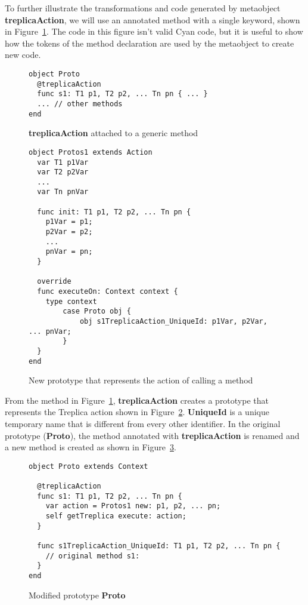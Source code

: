 \documentclass[preprint,review]{elsarticle}
\newcommand{\srcstyle}[1]{\ttfamily\textbf{#1}\rmfamily}
\begin{document}
To  further  illustrate  the  transformations and  code  generated  by
metaobject \srcstyle{treplicaAction}, we will  use an annotated method
with a single keyword, shown in Figure~\ref{fig:tag}. The code in this
figure isn't valid Cyan code, but it  is useful to show how the tokens
of the  method declaration are  used by  the metaobject to  create new
code.
\begin{figure}[hp]
\centering
\begin{lstlisting}
object Proto
  @treplicaAction
  func s1: T1 p1, T2 p2, ... Tn pn { ... }
  ... // other methods
end
\end{lstlisting}
\caption{\srcstyle{treplicaAction} attached to a generic method}
\label{fig:tag}
\end{figure}

\begin{figure}[hp]
\centering
\begin{lstlisting}
object Protos1 extends Action
  var T1 p1Var
  var T2 p2Var
  ...
  var Tn pnVar

  func init: T1 p1, T2 p2, ... Tn pn {
    p1Var = p1;
    p2Var = p2;
    ...
    pnVar = pn;
  }

  override
  func executeOn: Context context {
    type context
        case Proto obj {
            obj s1TreplicaAction_UniqueId: p1Var, p2Var, ... pnVar;
        }
  }
end
\end{lstlisting}
\caption{New prototype that represents the action of calling a method}
\label{fig:protos1}
\end{figure}

From  the  method in  Figure~\ref{fig:tag},  \srcstyle{treplicaAction}
creates  a prototype  that  represents the  Treplica  action shown  in
Figure~\ref{fig:protos1}.  \srcstyle{UniqueId}  is a  unique temporary
name that is  different from every other identifier.   In the original
prototype    (\srcstyle{Proto}),    the    method    annotated    with
\srcstyle{treplicaAction} is  renamed and a  new method is  created as
shown in Figure~\ref{fig:newproto}.

\begin{figure}[hp]
\centering
\begin{lstlisting}
object Proto extends Context

  @treplicaAction
  func s1: T1 p1, T2 p2, ... Tn pn {
    var action = Protos1 new: p1, p2, ... pn;
    self getTreplica execute: action;
  }

  func s1TreplicaAction_UniqueId: T1 p1, T2 p2, ... Tn pn {
    // original method s1:
  }
end
\end{lstlisting}
\caption{Modified prototype \srcstyle{Proto} }
\label{fig:newproto}
\end{figure}
\end{document}
